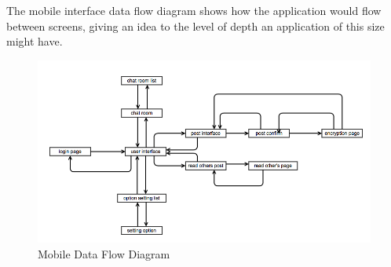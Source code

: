 The mobile interface data flow diagram shows how the application would flow 
between screens, giving an idea to the level of depth an application of this 
size might have.

\begin{figure}[h]
    \centering
    \includegraphics[width=\textwidth]{images/design/mobile_flow_diag.png}
    \caption{Mobile Data Flow Diagram}
    \label{fig:mobile_flow}
\end{figure}